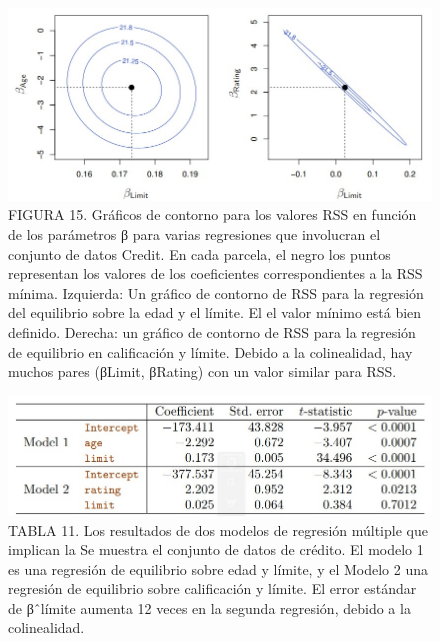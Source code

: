 \documentclass[
  letterpaper,
  DIV=11,
  numbers=noendperiod]{scrartcl}
\begin{document}
\begin{figure}

{\centering \includegraphics{images/jh1.jpg}

}

\caption{FIGURA 15. Gráficos de contorno para los valores RSS en función
de los parámetros β para varias regresiones que involucran el conjunto
de datos Credit. En cada parcela, el negro los puntos representan los
valores de los coeficientes correspondientes a la RSS mínima. Izquierda:
Un gráfico de contorno de RSS para la regresión del equilibrio sobre la
edad y el límite. El el valor mínimo está bien definido. Derecha: un
gráfico de contorno de RSS para la regresión de equilibrio en
calificación y límite. Debido a la colinealidad, hay muchos pares
(βLimit, βRating) con un valor similar para RSS.}

\end{figure}

\begin{figure}

{\centering \includegraphics{images/te.jpg}

}

\caption{TABLA 11. Los resultados de dos modelos de regresión múltiple
que implican la Se muestra el conjunto de datos de crédito. El modelo 1
es una regresión de equilibrio sobre edad y límite, y el Modelo 2 una
regresión de equilibrio sobre calificación y límite. El error estándar
de βˆlímite aumenta 12 veces en la segunda regresión, debido a la
colinealidad.}

\end{figure}
\end{document}
